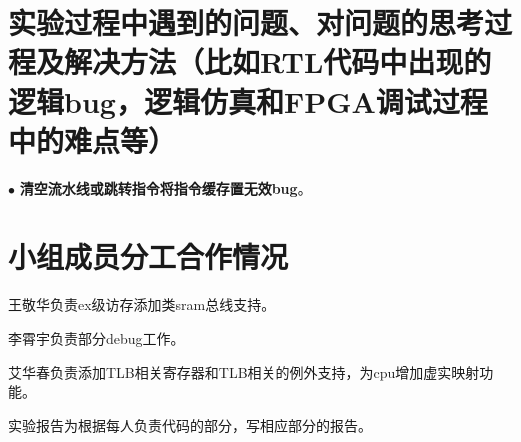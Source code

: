 \documentclass[11pt]{article}
\begin{document}
\section{实验过程中遇到的问题、对问题的思考过程及解决方法（比如RTL代码中出现的逻辑bug，逻辑仿真和FPGA调试过程中的难点等）}

\noindent
$\bullet$
\textbf{清空流水线或跳转指令将指令缓存置无效bug}。


      
\vspace{1ex}

\section{小组成员分工合作情况}
王敬华负责ex级访存添加类sram总线支持。

李霄宇负责部分debug工作。

艾华春负责添加TLB相关寄存器和TLB相关的例外支持，为cpu增加虚实映射功能。

实验报告为根据每人负责代码的部分，写相应部分的报告。
\end{document}
